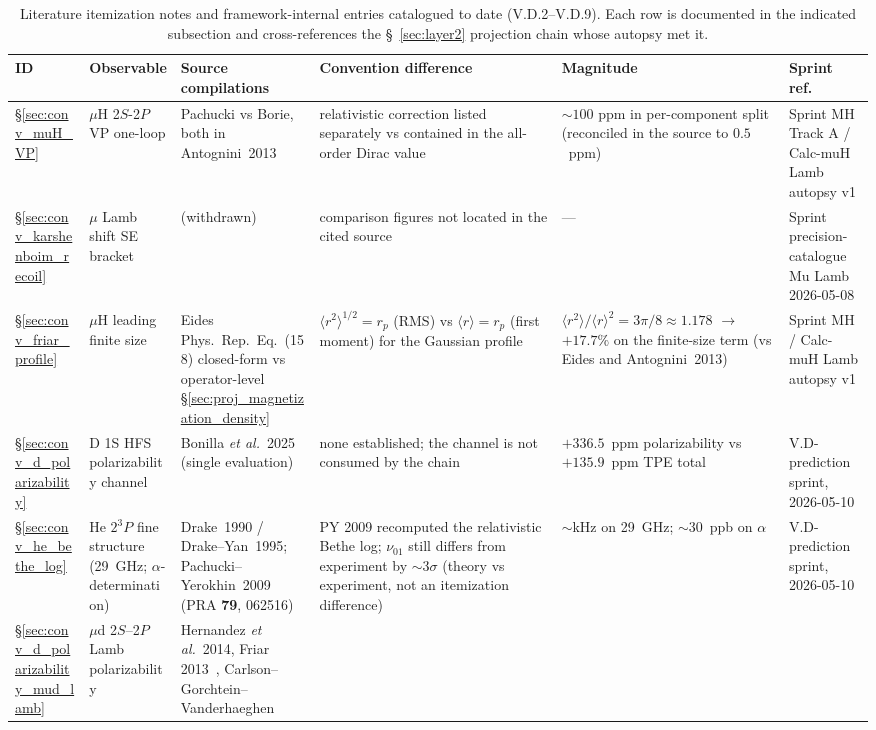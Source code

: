 \documentclass[11pt]{article}
\begin{document}
\begin{table}[h]
\centering\small
\caption{Literature itemization notes and framework-internal entries
catalogued to date (V.D.2--V.D.9).  Each row is documented in the
indicated subsection and cross-references the \S~\ref{sec:layer2}
projection chain whose autopsy met it.}
\label{tab:convention_exposures}
\begin{tabular}{p{0.6cm} p{2.6cm} p{3.0cm} p{2.6cm} p{1.6cm} p{1.6cm}}
\toprule
ID & Observable & Source compilations & Convention difference &
Magnitude & Sprint ref. \\
\midrule
\S\ref{sec:conv_muH_VP} & $\mu$H 2$S$-2$P$ VP one-loop &
Pachucki vs Borie, both in Antognini~2013 &
relativistic correction listed separately vs contained in the all-order
Dirac value &
$\sim 100$ ppm in per-component split (reconciled in the source to
$0.5$~ppm) &
Sprint MH Track A / Calc-muH Lamb autopsy v1 \\
\S\ref{sec:conv_karshenboim_recoil} & $\mu$ Lamb shift SE bracket &
(withdrawn) &
comparison figures not located in the cited source &
--- &
Sprint precision-catalogue Mu Lamb 2026-05-08 \\
\S\ref{sec:conv_friar_profile} & $\mu$H leading finite size &
Eides Phys.\ Rep.\ Eq.~(158) closed-form vs operator-level
\S\ref{sec:proj_magnetization_density} &
$\langle r^2\rangle^{1/2} = r_p$ (RMS) vs $\langle r\rangle = r_p$
(first moment) for the Gaussian profile &
$\langle r^2\rangle/\langle r\rangle^2 = 3\pi/8 \approx 1.178$
$\to$ $+17.7\%$ on the finite-size term (vs Eides and Antognini~2013) &
Sprint MH / Calc-muH Lamb autopsy v1 \\
\S\ref{sec:conv_d_polarizability} & D 1S HFS polarizability channel &
Bonilla \emph{et al.}~2025~\cite{bonilla2025} (single evaluation) &
none established; the channel is not consumed by the chain &
$+336.5$~ppm polarizability vs $+135.9$~ppm TPE total &
V.D-prediction sprint, 2026-05-10 \\
\S\ref{sec:conv_he_bethe_log} & He $2{}^3P$ fine structure (29~GHz; $\alpha$-determination) &
Drake~1990 / Drake--Yan~1995; Pachucki--Yerokhin~2009 (PRA \textbf{79}, 062516) &
PY 2009 recomputed the relativistic Bethe log; $\nu_{01}$ still differs from experiment by $\sim3\sigma$ (theory vs experiment, not an itemization difference) &
$\sim$kHz on 29~GHz; $\sim 30$~ppb on $\alpha$ &
V.D-prediction sprint, 2026-05-10 \\
\S\ref{sec:conv_d_polarizability_mud_lamb} &
$\mu$d 2$S$--2$P$ Lamb polarizability &
Hernandez \emph{et al.}\ 2014, Friar 2013~\cite{friar2013}, Carlson--Gorchtein--Vanderhaeghen

\end{tabular}
\end{table}
\end{document}
